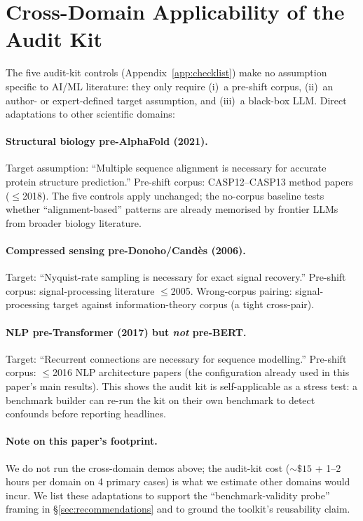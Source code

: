 \documentclass[11pt]{article}
\begin{document}
\section{Cross-Domain Applicability of the Audit Kit}\label{app:crossdomain}

The five audit-kit controls (Appendix~\ref{app:checklist}) make no assumption specific to AI/ML literature: they only require (i)~a pre-shift corpus, (ii)~an author- or expert-defined target assumption, and (iii)~a black-box LLM. Direct adaptations to other scientific domains:

\paragraph{Structural biology pre-AlphaFold (2021).} Target assumption: ``Multiple sequence alignment is necessary for accurate protein structure prediction.'' Pre-shift corpus: CASP12--CASP13 method papers ($\leq$2018). The five controls apply unchanged; the no-corpus baseline tests whether ``alignment-based'' patterns are already memorised by frontier LLMs from broader biology literature.

\paragraph{Compressed sensing pre-Donoho/Cand\`es (2006).} Target: ``Nyquist-rate sampling is necessary for exact signal recovery.'' Pre-shift corpus: signal-processing literature $\leq$2005. Wrong-corpus pairing: signal-processing target against information-theory corpus (a tight cross-pair).

\paragraph{NLP pre-Transformer (2017) but \emph{not} pre-BERT.} Target: ``Recurrent connections are necessary for sequence modelling.'' Pre-shift corpus: $\leq$2016 NLP architecture papers (the configuration already used in this paper's main results). This shows the audit kit is self-applicable as a stress test: a benchmark builder can re-run the kit on their own benchmark to detect confounds before reporting headlines.

\paragraph{Note on this paper's footprint.} We do not run the cross-domain demos above; the audit-kit cost (${\sim}\$15$ + 1--2 hours per domain on 4 primary cases) is what we estimate other domains would incur. We list these adaptations to support the ``benchmark-validity probe'' framing in \S\ref{sec:recommendations} and to ground the toolkit's reusability claim.
\end{document}
